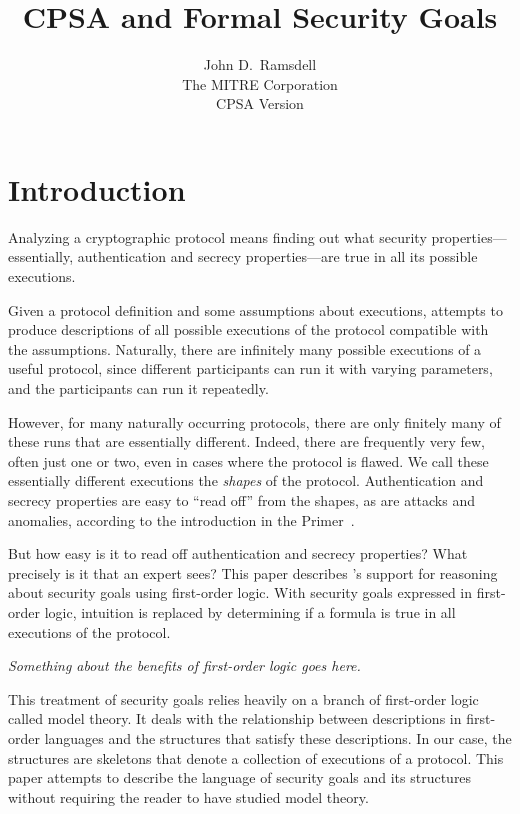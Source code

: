 \documentclass[12pt]{article}
\title{CPSA and Formal Security Goals}
\author{John D.~Ramsdell\\
  The MITRE Corporation\\ CPSA Version \version}
\begin{document}
\maketitle
\cpsacopying

\tableofcontents

\newpage

\listoffigures

\listoftables

\newpage

\section{Introduction}

\begin{sloppypar}
Analyzing a cryptographic protocol means finding out what security
properties---essentially, authentication and secrecy properties---are
true in all its possible executions.
\end{sloppypar}

Given a protocol definition and some assumptions about executions,
{\cpsa} attempts to produce descriptions of all possible executions of
the protocol compatible with the assumptions.  Naturally, there are
infinitely many possible executions of a useful protocol, since
different participants can run it with varying parameters, and the
participants can run it repeatedly.

However, for many naturally occurring protocols, there are only
finitely many of these runs that are essentially different.  Indeed,
there are frequently very few, often just one or two, even in cases
where the protocol is flawed.  We call these essentially different
executions the \emph{shapes} of the protocol.  Authentication and
secrecy properties are easy to ``read off'' from the shapes, as are
attacks and anomalies, according to the introduction in the {\cpsa}
Primer~\cite{cpsaprimer09}.

But how easy is it to read off authentication and secrecy properties?
What precisely is it that an expert sees?  This paper describes
{\cpsa}'s support for reasoning about security goals using first-order
logic.  With security goals expressed in first-order logic, intuition
is replaced by determining if a formula is true in all executions of
the protocol.

\emph{Something about the benefits of first-order logic goes here.}

This treatment of security goals relies heavily on a branch of
first-order logic called model theory.  It deals with the relationship
between descriptions in first-order languages and the structures that
satisfy these descriptions.  In our case, the structures are skeletons
that denote a collection of executions of a protocol.  This paper
attempts to describe the language of security goals and its
structures without requiring the reader to have studied model theory.
\end{document}
